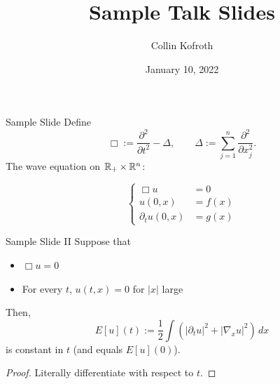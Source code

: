 \documentclass[article]{beamer}
\title[Conference Name]{Sample Talk Slides}
\author{Collin Kofroth}  %
\institute[Name of University] %
{
\small{Name of University} \\ %
}
\date{January 10, 2022} %
\begin{document}
\begin{frame}
    \titlepage 
\end{frame}


 
\begin{frame}{Sample Slide} 
Define $$\Box:=\frac{\partial^2}{\partial t^2}-\Delta,\qquad \Delta:=\sum\limits_{j=1}^n\frac{\partial^2}{\partial x_j^2}.$$ The wave equation on $\mathbb{R}_+\times\mathbb{R}^n$:
    
\begin{equation*}
    \left\{\begin{aligned}
        \Box u&=0\\
        u(0,x)&=f(x)\\
        \partial_t u(0,x)&=g(x)
    \end{aligned}\right.
\end{equation*}
    
\vspace*{.1in}
{
}
\end{frame}

\begin{frame}{Sample Slide II}
Suppose that 

\begin{itemize}
    \item $\Box u=0$
    \item For every $t$, $u(t,x)=0$ for $|x|$ large
\end{itemize} 

\vspace*{.15in}
Then,  $$E[u](t):=\frac{1}{2}\int \left(|\partial_tu|^2+|\nabla_x u|^2\right)\, dx$$is  constant in $t$ (and equals $E[u](0)$).
\vspace*{.1in} 

\begin{proof}
  Literally differentiate with respect to $t$.
\end{proof}
\end{frame}
\end{document}
